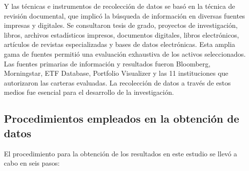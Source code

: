 \documentclass[a4paper,fleqn]{cas-sc}
\begin{document}
Y las técnicas e instrumentos de recolección de datos  se basó en la técnica de revisión documental, que implicó la búsqueda de información en diversas fuentes impresas y digitales. Se consultaron tesis de grado, proyectos de investigación, libros, archivos estadísticos impresos, documentos digitales, libros electrónicos, artículos de revistas especializadas y bases de datos electrónicas. Esta amplia gama de fuentes permitió una evaluación exhaustiva de los activos seleccionados. Las fuentes primarias de información y resultados fueron Bloomberg, Morningstar, ETF Database, Portfolio Visualizer y las 11 instituciones que autorizaron las carteras evaluadas. La recolección de datos a través de estos medios fue esencial para el desarrollo de la investigación.

\subsection{Procedimientos empleados en la obtención de datos}

El procedimiento para la obtención de los resultados en este estudio se llevó a cabo en seis pasos:
\end{document}
